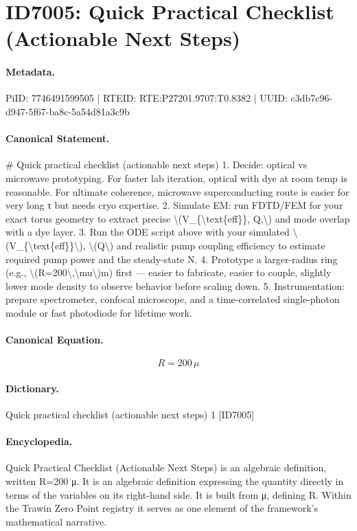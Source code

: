 \section*{ID7005: Quick Practical Checklist (Actionable Next Steps)}
\paragraph{Metadata.}
PiID: 7746491599505 | RTEID: RTE:P27201.9707:T0.8382 | UUID: c3db7c96-d947-5f67-ba8c-5a54d81a3c9b

\paragraph{Canonical Statement.}
\# Quick practical checklist (actionable next steps) 1. Decide: optical vs microwave prototyping. For faster lab iteration, optical with dye at room temp is reasonable. For ultimate coherence, microwave superconducting route is easier for very long τ but needs cryo expertise. 2. Simulate EM: run FDTD/FEM for your exact torus geometry to extract precise \textbackslash{}(V\_\{\textbackslash{}text\{eff\}\}, Q,\textbackslash{}) and mode overlap with a dye layer. 3. Run the ODE script above with your simulated \textbackslash{}(V\_\{\textbackslash{}text\{eff\}\}\textbackslash{}), \textbackslash{}(Q\textbackslash{}) and realistic pump coupling efficiency to estimate required pump power and the steady-state N. 4. Prototype a larger-radius ring (e.g., \textbackslash{}(R=200\textbackslash{},\textbackslash{}mu\textbackslash{})m) first — easier to fabricate, easier to couple, slightly lower mode density to observe behavior before scaling down. 5. Instrumentation: prepare spectrometer, confocal microscope, and a time-correlated single-photon module or fast photodiode for lifetime work.

\paragraph{Canonical Equation.}
\[
R=200\,\mu
\]

\paragraph{Dictionary.}
Quick practical checklist (actionable next steps) 1 [ID7005]

\paragraph{Encyclopedia.}
Quick Practical Checklist (Actionable Next Steps) is an algebraic definition, written R=200 μ. It is an algebraic definition expressing the quantity directly in terms of the variables on its right-hand side. It is built from μ, defining R. Within the Trawin Zero Point registry it serves as one element of the framework's mathematical narrative.
